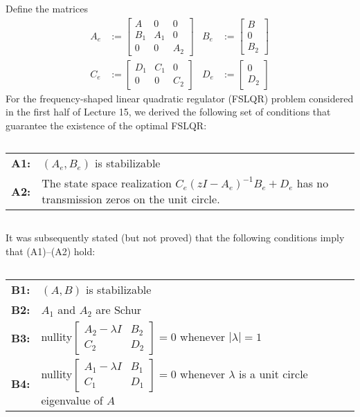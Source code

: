 \item
Define the matrices
\begin{align*}
    A_e & := \begin{bmatrix}
            A & 0 & 0 \\
            B_1 & A_1 & 0 \\
            0 & 0 & A_2
        \end{bmatrix} 
        & B_e & := \begin{bmatrix}
            B \\
            0 \\
            B_2
        \end{bmatrix} \\
    C_e & := \begin{bmatrix}
            D_1 & C_1 & 0 \\
            0 & 0 & C_2
        \end{bmatrix}
        & D_e & := \begin{bmatrix}
            0 \\
            D_2
        \end{bmatrix}
\end{align*}
For the frequency-shaped linear quadratic regulator (FSLQR) problem considered in the first half of Lecture 15, we derived the following set of conditions that guarantee the existence of the optimal FSLQR:

$\,$

\begin{tabular}{p{0.5cm}p{14cm}}
    \textbf{A1:} & $(A_e,B_e)$ is stabilizable \\
    \textbf{A2:} & The state space realization $C_e (zI - A_e)^{-1} B_e + D_e$ has no transmission zeros on the unit circle.
\end{tabular}

$\,$

It was subsequently stated (but not proved) that the following conditions imply that (A1)--(A2) hold:

$\,$

\begin{tabular}{p{0.5cm}p{14cm}}
    \textbf{B1:} 
        & $(A,B)$ is stabilizable \\
    \textbf{B2:} 
        & $A_1$ and $A_2$ are Schur \\
    \textbf{B3:}
        & nullity$\begin{bmatrix} A_2 - \lambda I & B_2 \\ C_2 & D_2 \end{bmatrix} = 0$ whenever $|\lambda| = 1$ \\
    \textbf{B4:}
        & nullity$\begin{bmatrix} A_1 - \lambda I & B_1 \\ C_1 & D_1 \end{bmatrix} = 0$ whenever $\lambda$ is a unit circle eigenvalue of $A$
\end{tabular}

